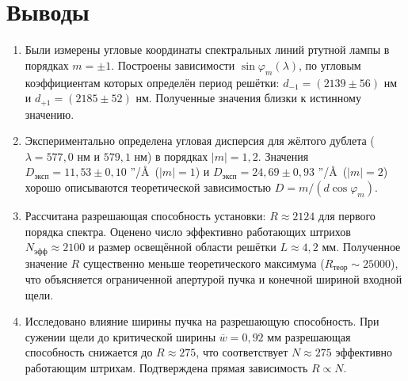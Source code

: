 \documentclass[12pt,a4paper]{article}
\begin{document}







\section*{Выводы}


\begin{enumerate}
    \item Были измерены угловые координаты спектральных линий ртутной лампы в порядках $m = \pm 1$. Построены зависимости $\sin\varphi_m(\lambda)$, по угловым коэффициентам которых определён период решётки: $d_{-1} = (2139 \pm 56)$ нм и $d_{+1} = (2185 \pm 52)$ нм. Полученные значения близки к истинному значению. %

    \item Экспериментально определена угловая дисперсия для жёлтого дублета ($\lambda = 577{,}0$ нм и $579{,}1$ нм) в порядках $|m| = 1, 2$. Значения $D_{\text{эксп}} = 11{,}53 \pm 0{,}10$ ''/\AA\ ($|m|=1$) и $D_{\text{эксп}} = 24{,}69 \pm 0{,}93$ ''/\AA\ ($|m|=2$) хорошо описываются теоретической зависимостью $D = m/(d\cos\varphi_m)$.

    \item Рассчитана разрешающая способность установки: $R \approx 2124$ для первого порядка спектра. Оценено число эффективно работающих штрихов $N_{\text{эфф}} \approx 2100$ и размер освещённой области решётки $L \approx 4{,}2$ мм. Полученное значение $R$ существенно меньше теоретического максимума ($R_{\text{теор}} \sim 25000$), что объясняется ограниченной апертурой пучка и конечной шириной входной щели.


    \item Исследовано влияние ширины пучка на разрешающую способность. При сужении щели до критической ширины $\overline{w} = 0{,}92$ мм разрешающая способность снижается до $R \approx 275$, что соответствует $N \approx 275$ эффективно работающим штрихам. Подтверждена прямая зависимость $R \propto N$.
\end{enumerate}
\end{document}
